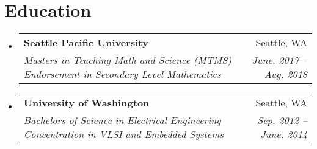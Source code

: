 \documentclass[letterpaper,11pt]{article}
\makeatletter
\newcommand{\resumeSubheading}[4]{
  \vspace{4pt}\item
    \begin{tabular*}{0.97\textwidth}{p{0.7\textwidth} @{\extracolsep{\fill}} r}
      \textbf{#1} & #2 \\
      \raggedright{\textit{\small#3}} & \textit{\small #4} \\
    \end{tabular*}\vspace{-4pt}
}
\newcommand{\resumeSubHeadingListStart}{\begin{itemize}[leftmargin=*]}
\newcommand{\resumeSubHeadingListEnd}{\end{itemize}}
\makeatother
\begin{document}
  \section{Education}
    \resumeSubHeadingListStart
      \resumeSubheading
      {Seattle Pacific University}{Seattle, WA}
      {Masters in Teaching Math and Science (MTMS) \newline Endorsement in Secondary Level Mathematics}{June. 2017 -- Aug. 2018}
      \resumeSubheading
      {University of Washington}{Seattle, WA}
      {Bachelors of Science in Electrical Engineering \newline Concentration in VLSI and Embedded Systems}{Sep. 2012 -- June. 2014}
    \resumeSubHeadingListEnd
  
\end{document}
